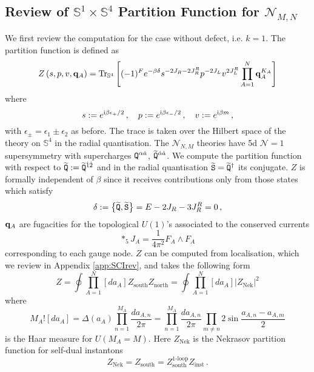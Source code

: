 \documentclass[main.tex]{subfiles}
\begin{document}
\subsection{Review of \texorpdfstring{$\mathbb{S}^1\times \mathbb{S}^4$}{S1 x S4} Partition Function for \texorpdfstring{$\mathcal{N}_{M,N}$}{N(M,N)}}
We first review the computation for the case without defect, i.e. $k=1$. The partition function is defined as
\begin{equation}\label{eqn:5dindex}
Z\left(s,p,v,\mathbf{q}_A\right)=\operatorname{Tr}_{\mathbb{S}^4}\left[(-1)^Fe^{-\beta\delta}s^{-2J_R-2J_R^R}p^{-2J_L}v^{2J_L^R}\prod_{A=1}^N\mathbf{q}_A^{K_A}\right]
\end{equation}
where 
\begin{equation}
s:=e^{\mathrm{i}\beta\epsilon_+/2}\,,\quad p:=e^{\mathrm{i}\beta\epsilon_-/2}\,,\quad v:=e^{\mathrm{i}\beta m}\,,
\end{equation}
with $\epsilon_{\pm}=\epsilon_1\pm\epsilon_2$ as before. The trace is taken over the Hilbert space of the theory on $\mathbb{S}^4$ in the radial quantisation. The $\mathcal{N}_{N,M}$ theories have 5d $\mathcal{N}=1$ supersymmetry with supercharges $\mathtt{Q}^{\alpha \dot a}$, $\widetilde{\mathtt{Q}}^{\dot\alpha \dot a}$. 
We compute the partition function with respect to $\widetilde{\mathtt{Q}}:=\widetilde{\mathtt{Q}}^{\dot1\dot2}$ and in the radial quantisation $\widetilde{\mathtt{S}}=\widetilde{\mathtt{Q}}^{\dagger}$ its conjugate. 
$Z$ is formally independent of $\beta$ since it receives contributions only from those states which satisfy
\begin{equation}\label{eqn:BPS}
\delta:=\left\{\widetilde{\mathtt{Q}},\widetilde{\mathtt{S}}\right\}=E-2J_R-3J_R^R=0\,,
\end{equation}
$\mathbf{q}_A$ are fugacities for the topological $U(1)$'s associated to the conserved currents
\begin{equation}
\ast_5 J_A=\frac{1}{4\pi^2}F_A\wedge F_A
\end{equation}
corresponding to each gauge node. $Z$ can be computed from localisation, which we review in Appendix \ref{app:SCIrev}, and takes the following form
\begin{equation}\label{eqn:5dindexgeneric}
Z=\oint\prod_{A=1}^N\left[da_A\right]Z_{\text{south}}Z_{\text{north}}=\oint\prod_{A=1}^N\left[da_A\right]\left|Z_{\text{Nek}}\right|^2
\end{equation} 
where
\begin{equation}
M_{A}![da_A]=\Delta(a_A)\prod_{n=1}^{M_A}\frac{d a_{A,n}}{2\pi}=\prod_{n=1}^{M_A}\frac{d a_{A,n}}{2\pi}\prod_{m\neq n}2\sin\frac{a_{A,n}-a_{A,m}}{2}
\end{equation}
is the Haar measure for $U(M_A=M)$. Here $Z_{\text{Nek}}$ is the Nekrasov partition function for self-dual instantons
\begin{equation}
Z_{\text{Nek}}=Z_{\text{south}}=Z^{\text{1-loop}}_{\text{south}}Z_{\text{inst}}\,.
\end{equation}
\end{document}
